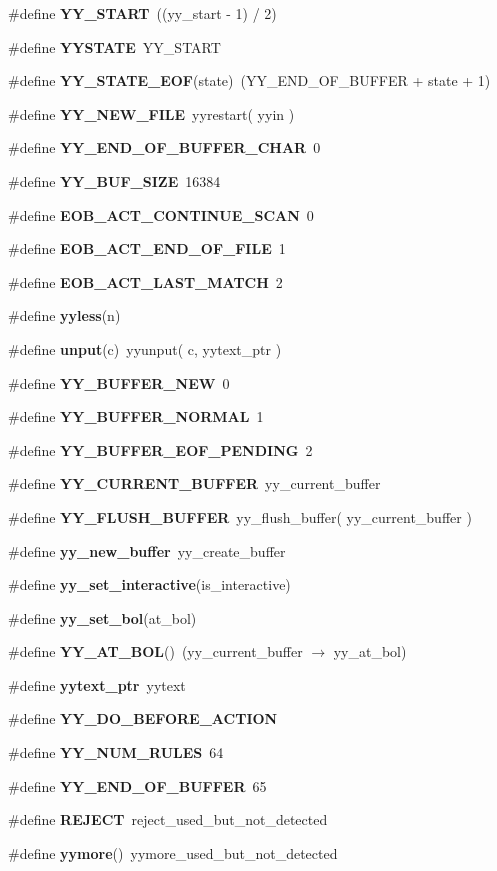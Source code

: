 \begin{CompactItemize}
\item 
\#define {\bf YY\_\-START}\ ((yy\_\-start - 1) / 2)
\item 
\#define {\bf YYSTATE}\ YY\_\-START
\item 
\#define {\bf YY\_\-STATE\_\-EOF}(state)\ (YY\_\-END\_\-OF\_\-BUFFER + state + 1)
\item 
\#define {\bf YY\_\-NEW\_\-FILE}\ yyrestart( yyin )
\item 
\#define {\bf YY\_\-END\_\-OF\_\-BUFFER\_\-CHAR}\ 0
\item 
\#define {\bf YY\_\-BUF\_\-SIZE}\ 16384
\item 
\#define {\bf EOB\_\-ACT\_\-CONTINUE\_\-SCAN}\ 0
\item 
\#define {\bf EOB\_\-ACT\_\-END\_\-OF\_\-FILE}\ 1
\item 
\#define {\bf EOB\_\-ACT\_\-LAST\_\-MATCH}\ 2
\item 
\#define {\bf yyless}(n)
\item 
\#define {\bf unput}(c)\ yyunput( c, yytext\_\-ptr )
\item 
\#define {\bf YY\_\-BUFFER\_\-NEW}\ 0
\item 
\#define {\bf YY\_\-BUFFER\_\-NORMAL}\ 1
\item 
\#define {\bf YY\_\-BUFFER\_\-EOF\_\-PENDING}\ 2
\item 
\#define {\bf YY\_\-CURRENT\_\-BUFFER}\ yy\_\-current\_\-buffer
\item 
\#define {\bf YY\_\-FLUSH\_\-BUFFER}\ yy\_\-flush\_\-buffer( yy\_\-current\_\-buffer )
\item 
\#define {\bf yy\_\-new\_\-buffer}\ yy\_\-create\_\-buffer
\item 
\#define {\bf yy\_\-set\_\-interactive}(is\_\-interactive)
\item 
\#define {\bf yy\_\-set\_\-bol}(at\_\-bol)
\item 
\#define {\bf YY\_\-AT\_\-BOL}()\ (yy\_\-current\_\-buffer $\rightarrow$ yy\_\-at\_\-bol)
\item 
\#define {\bf yytext\_\-ptr}\ yytext
\item 
\#define {\bf YY\_\-DO\_\-BEFORE\_\-ACTION}
\item 
\#define {\bf YY\_\-NUM\_\-RULES}\ 64
\item 
\#define {\bf YY\_\-END\_\-OF\_\-BUFFER}\ 65
\item 
\#define {\bf REJECT}\ reject\_\-used\_\-but\_\-not\_\-detected
\item 
\#define {\bf yymore}()\ yymore\_\-used\_\-but\_\-not\_\-detected
\item 

\end{CompactItemize}

